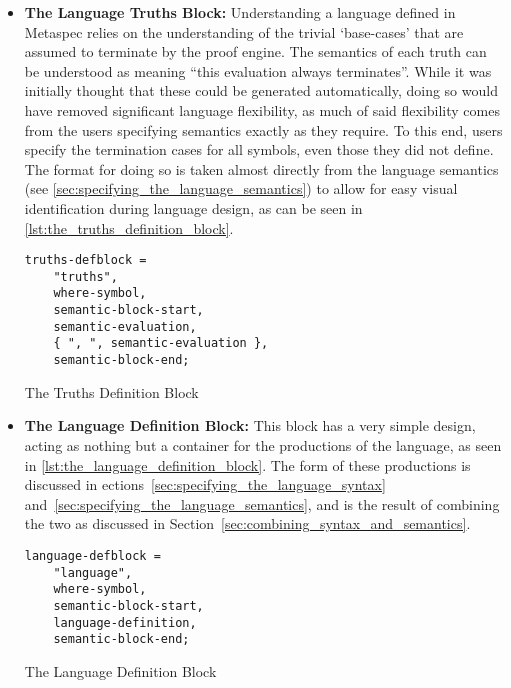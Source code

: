 \begin{itemize}
    \item \textbf{The Language Truths Block:} Understanding a language defined in Metaspec relies on the understanding of the trivial `base-cases' that are assumed to terminate by the proof engine. 
    The semantics of each truth can be understood as meaning ``this evaluation always terminates''.
    While it was initially thought that these could be generated automatically, doing so would have removed significant language flexibility, as much of said flexibility comes from the users specifying semantics exactly as they require. 
    To this end, users specify the termination cases for all symbols, even those they did not define.
    The format for doing so is taken almost directly from the language semantics (see \autoref{sec:specifying_the_language_semantics}) to allow for easy visual identification during language design, as can be seen in \autoref{lst:the_truths_definition_block}.
\begin{listing}[!htb]
\begin{verbatim}
truths-defblock =
    "truths",
    where-symbol, 
    semantic-block-start,
    semantic-evaluation,
    { ", ", semantic-evaluation },
    semantic-block-end;
\end{verbatim}
\caption{The Truths Definition Block}
\label{lst:the_truths_definition_block}
\end{listing}

    \item \textbf{The Language Definition Block:} This block has a very simple design, acting as nothing but a container for the productions of the language, as seen in \autoref{lst:the_language_definition_block}.
    The form of these productions is discussed in ections~\ref{sec:specifying_the_language_syntax} and~\ref{sec:specifying_the_language_semantics}, and is the result of combining the two as discussed in Section~\ref{sec:combining_syntax_and_semantics}.
\begin{listing}[!htb]
\begin{verbatim}
language-defblock =
    "language",
    where-symbol,
    semantic-block-start,
    language-definition,
    semantic-block-end;
\end{verbatim}
\caption{The Language Definition Block}
\label{lst:the_language_definition_block}
\end{listing}


\end{itemize}
